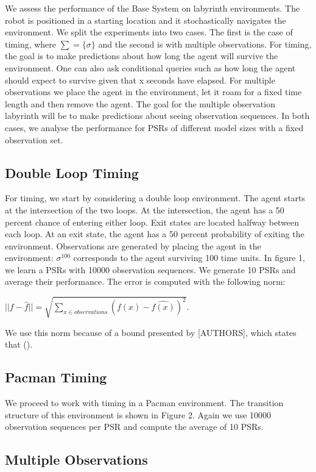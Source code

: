 \documentclass[letterpaper]{article}
\begin{document}
We assess the performance of the Base System on labyrinth environments. The robot is positioned in a starting location and it stochastically navigates the environment. We split the experiments into two cases. The first is the case of timing, where $\sum = \{\sigma\}$ and the second is with multiple observations. For timing, the goal is to make predictions about how long the agent will survive the environment. One can also ask conditional queries such as how long the agent should expect to survive given that x seconds have elapsed. For multiple observations we place the agent in the environment, let it roam for a fixed time length and then remove the agent. The goal for the multiple observation labyrinth will be to make predictions about seeing observation sequences. In both cases, we analyse the performance for PSRs of different model sizes with a fixed observation set.

\subsection{Double Loop Timing}

For timing, we start by considering a double loop environment. The agent starts at the intersection of the two loops. At the intersection, the agent has a 50 percent chance of entering either loop. Exit states are located halfway between each loop. At an exit state, the agent has a 50 percent probability of exiting the environment. Observations are generated by placing the agent in the environment: $\sigma^100$ corresponds to the agent surviving 100 time units. In figure 1, we learn a PSRs with 10000 observation sequences. We generate 10 PSRs and average their performance. The error is computed with the following norm:

 $||f - \hat{f}|| = \sqrt{\sum\nolimits_{x \in observations}(f(x) - \hat{f(x)})^2}$.
 
We use this norm because of a bound presented by [AUTHORS], which states that ().

\subsection{Pacman Timing}

We proceed to work with timing in a Pacman environment. The transition structure of this environment is shown in Figure 2. Again we use 10000 observation sequences per PSR and compute the average of 10 PSRs. 

\subsection{Multiple Observations}
\end{document}
